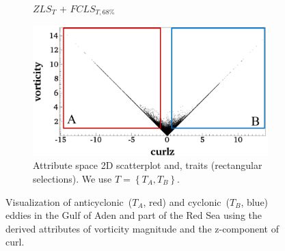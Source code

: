 \begin{figure}[!h]
\begin{subfigure}{0.24\linewidth}
\vspace{-2mm}
\caption{$ZLS_{T}$ + $FCLS_{T,68\%}$}
\label{fig:rse_fcls}
\end{subfigure}
\hfill
\begin{subfigure}{0.24\linewidth}
\centering
\includegraphics[width=0.95\linewidth]{Images/RedSeaEddy/scatterplot.pdf}
\vspace{-2mm}
\caption{Attribute space 2D scatterplot and, traits (rectangular selections). We use $T = \left\{T_{A}, T_{B}\right\}$.} 
\label{fig:rse_scatterplot}
\end{subfigure}
\vspace{-2mm}
\caption{Visualization of anticyclonic~($T_{A}$, red) and cyclonic~($T_{B}$, blue) eddies in the Gulf of Aden and part of the Red Sea using the derived attributes of vorticity magnitude and the z-component of curl.}
\vspace{-2mm}
\label{fig:rse}
\end{figure}

